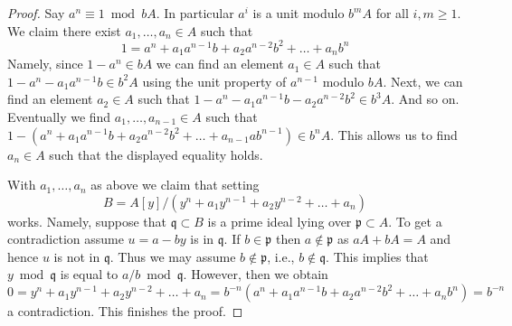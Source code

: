 \documentclass[10pt,a4paper]{amsart}
\theoremstyle{plain}
\theoremstyle{definition}
\theoremstyle{remark}
\numberwithin{equation}{subsection}
\begin{document}
\begin{proof}
Say $a^n \equiv 1 \bmod bA$. In particular $a^i$ is a unit modulo
$b^mA$ for all $i, m \geq 1$. We claim there exist
$a_1, \ldots, a_n \in A$ such that
$$
1 = a^n + a_1 a^{n - 1}b + a_2 a^{n - 2}b^2 + \ldots + a_n b^n
$$
Namely, since $1 - a^n \in bA$ we can find an element $a_1 \in A$
such that $1 - a^n - a_1 a^{n - 1} b \in b^2A$ using the unit property
of $a^{n - 1}$ modulo $bA$. Next, we can find an element $a_2 \in A$
such that $1 - a^n - a_1 a^{n - 1} b - a_2 a^{n - 2} b^2 \in b^3A$.
And so on. Eventually we find $a_1, \ldots, a_{n - 1} \in A$
such that $1 - (a^n + a_1 a^{n - 1}b + a_2 a^{n - 2}b^2 +
\ldots + a_{n - 1} ab^{n - 1}) \in b^nA$. This allows us to find
$a_n \in A$ such that the displayed equality holds.

\medskip\noindent
With $a_1, \ldots, a_n$ as above we claim that setting
$$
B = A[y]/(y^n + a_1 y^{n - 1} + a_2 y^{n - 2} + \ldots + a_n)
$$
works. Namely, suppose that $\mathfrak q \subset B$ is a prime ideal
lying over $\mathfrak p \subset A$. To get a contradiction
assume $u = a - by$ is in $\mathfrak q$. If $b \in \mathfrak p$
then $a \not \in \mathfrak p$ as $aA + bA = A$ and hence $u$ is not
in $\mathfrak q$. Thus we may assume $b \not \in \mathfrak p$, i.e.,
$b \not \in \mathfrak q$. This implies that $y \bmod \mathfrak q$
is equal to $a/b \bmod \mathfrak q$. However, then we obtain
$$
0 = y^n + a_1 y^{n - 1} + a_2 y^{n - 2} + \ldots + a_n =
b^{-n}(a^n + a_1 a^{n - 1}b + a_2 a^{n - 2}b^2 + \ldots + a_nb^n) =
b^{-n}
$$
a contradiction. This finishes the proof.
\end{proof}
\end{document}
